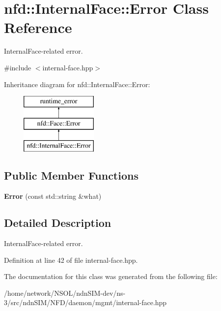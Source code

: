 \hypertarget{classnfd_1_1InternalFace_1_1Error}{}\section{nfd\+:\+:Internal\+Face\+:\+:Error Class Reference}
\label{classnfd_1_1InternalFace_1_1Error}


Internal\+Face-\/related error.  




{\ttfamily \#include $<$internal-\/face.\+hpp$>$}

Inheritance diagram for nfd\+:\+:Internal\+Face\+:\+:Error\+:\begin{figure}[H]
\begin{center}
\leavevmode
\includegraphics[height=3.000000cm]{classnfd_1_1InternalFace_1_1Error}
\end{center}
\end{figure}
\subsection*{Public Member Functions}
\begin{DoxyCompactItemize}
\item 
{\bfseries Error} (const std\+::string \&what)\hypertarget{classnfd_1_1InternalFace_1_1Error_a5ae8da0c48ff7193abd593bf0f63e36c}{}\label{classnfd_1_1InternalFace_1_1Error_a5ae8da0c48ff7193abd593bf0f63e36c}

\end{DoxyCompactItemize}


\subsection{Detailed Description}
Internal\+Face-\/related error. 

Definition at line 42 of file internal-\/face.\+hpp.



The documentation for this class was generated from the following file\+:\begin{DoxyCompactItemize}
\item 
/home/network/\+N\+S\+O\+L/ndn\+S\+I\+M-\/dev/ns-\/3/src/ndn\+S\+I\+M/\+N\+F\+D/daemon/mgmt/internal-\/face.\+hpp\end{DoxyCompactItemize}
